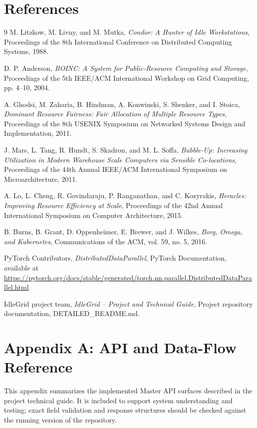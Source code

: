 \documentclass{article}
\begin{document}
	\section{References}
	\begin{thebibliography}{9}
M. Litzkow, M. Livny, and M. Mutka,
\textit{Condor: A Hunter of Idle Workstations},
Proceedings of the 8th International Conference on Distributed Computing Systems, 1988.

D. P. Anderson,
\textit{BOINC: A System for Public-Resource Computing and Storage},
Proceedings of the 5th IEEE/ACM International Workshop on Grid Computing, pp. 4--10, 2004.

A. Ghodsi, M. Zaharia, B. Hindman, A. Konwinski, S. Shenker, and I. Stoica,
\textit{Dominant Resource Fairness: Fair Allocation of Multiple Resource Types},
Proceedings of the 8th USENIX Symposium on Networked Systems Design and Implementation, 2011.

J. Mars, L. Tang, R. Hundt, S. Skadron, and M. L. Soffa,
\textit{Bubble-Up: Increasing Utilization in Modern Warehouse Scale Computers via Sensible Co-locations},
Proceedings of the 44th Annual IEEE/ACM International Symposium on Microarchitecture, 2011.

A. Lo, L. Cheng, R. Govindaraju, P. Ranganathan, and C. Kozyrakis,
\textit{Heracles: Improving Resource Efficiency at Scale},
Proceedings of the 42nd Annual International Symposium on Computer Architecture, 2015.

B. Burns, B. Grant, D. Oppenheimer, E. Brewer, and J. Wilkes,
\textit{Borg, Omega, and Kubernetes},
Communications of the ACM, vol. 59, no. 5, 2016.

PyTorch Contributors,
\textit{DistributedDataParallel},
PyTorch Documentation, available at \url{https://pytorch.org/docs/stable/generated/torch.nn.parallel.DistributedDataParallel.html}.

IdleGrid project team,
\textit{IdleGrid -- Project and Technical Guide},
Project repository documentation, DETAILED\_README.md.
\end{thebibliography} 

\pagebreak
\appendix
\section{Appendix A: API and Data-Flow Reference}
This appendix summarizes the implemented Master API surfaces described in the project technical guide. It is included to support system understanding and testing; exact field validation and response structures should be checked against the running version of the repository.
\end{document}
